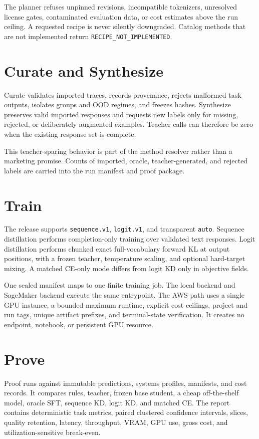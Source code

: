\documentclass[11pt]{article}
\begin{document}
The planner refuses unpinned revisions, incompatible tokenizers, unresolved license gates, contaminated evaluation data, or cost estimates above the run ceiling. A requested recipe is never silently downgraded. Catalog methods that are not implemented return \texttt{RECIPE\_NOT\_IMPLEMENTED}.

\section{Curate and Synthesize}
Curate validates imported traces, records provenance, rejects malformed task outputs, isolates groups and OOD regimes, and freezes hashes. Synthesize preserves valid imported responses and requests new labels only for missing, rejected, or deliberately augmented examples. Teacher calls can therefore be zero when the existing response set is complete.

This teacher-sparing behavior is part of the method resolver rather than a marketing promise. Counts of imported, oracle, teacher-generated, and rejected labels are carried into the run manifest and proof package.

\section{Train}
The release supports \texttt{sequence.v1}, \texttt{logit.v1}, and transparent \texttt{auto}. Sequence distillation performs completion-only training over validated text responses. Logit distillation performs chunked exact full-vocabulary forward KL at output positions, with a frozen teacher, temperature scaling, and optional hard-target mixing. A matched CE-only mode differs from logit KD only in objective fields.

One sealed manifest maps to one finite training job. The local backend and SageMaker backend execute the same entrypoint. The AWS path uses a single GPU instance, a bounded maximum runtime, explicit cost ceilings, project and run tags, unique artifact prefixes, and terminal-state verification. It creates no endpoint, notebook, or persistent GPU resource.

\section{Prove}
Proof runs against immutable predictions, systems profiles, manifests, and cost records. It compares rules, teacher, frozen base student, a cheap off-the-shelf model, oracle SFT, sequence KD, logit KD, and matched CE. The report contains deterministic task metrics, paired clustered confidence intervals, slices, quality retention, latency, throughput, VRAM, GPU use, gross cost, and utilization-sensitive break-even.
\end{document}
